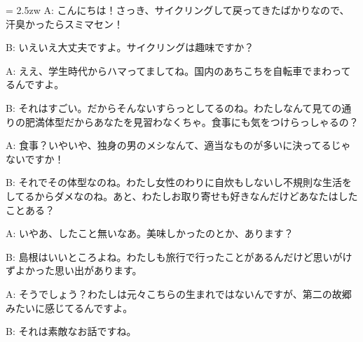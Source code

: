 \documentclass[11pt]{amsart}
\title{}
\author{}
\newenvironment{hangall}[1]{\hangindent = 2.5zw\everypar{\hangindent = 2.5zw}}{}
\begin{document}
\maketitle
\begin{hangall}{}%
A: こんにちは！さっき、サイクリングして戻ってきたばかりなので、汗臭かったらスミマセン！



B: いえいえ大丈夫ですよ。サイクリングは趣味ですか？



A: ええ、学生時代からハマってましてね。国内のあちこちを自転車でまわってるんですよ。



B: それはすごい。だからそんないすらっとしてるのね。わたしなんて見ての通りの肥満体型だからあなたを見習わなくちゃ。食事にも気をつけらっしゃるの？



A: 食事？いやいや、独身の男のメシなんて、適当なものが多いに決ってるじゃないですか！



B: それでその体型なのね。わたし女性のわりに自炊もしないし不規則な生活をしてるからダメなのね。あと、わたしお取り寄せも好きなんだけどあなたはしたことある？



A: いやあ、したこと無いなあ。美味しかったのとか、あります？



B: 島根はいいところよね。わたしも旅行で行ったことがあるんだけど思いがけずよかった思い出があります。



A: そうでしょう？わたしは元々こちらの生まれではないんですが、第二の故郷みたいに感じてるんですよ。



B: それは素敵なお話ですね。\end{hangall}
\end{document}
